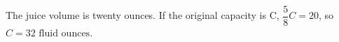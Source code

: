 The juice volume is twenty ounces. If the original capacity is C, $\dfrac{5}{8}C=20$, so $\boxed{C=32\text{ fluid ounces}}$.
